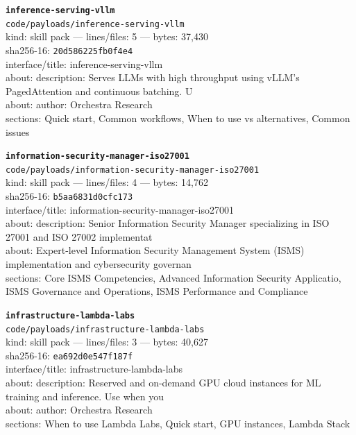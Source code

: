 \noindent\textbf{\texttt{inference-serving-vllm}}\\
\texttt{code/payloads/inference-serving-vllm}\\
kind: skill pack --- lines/files: 5 --- bytes: 37,430\\
sha256-16: \texttt{20d586225fb0f4e4}\\
interface/title: inference-serving-vllm\\
about: description: Serves LLMs with high throughput using vLLM's PagedAttention and continuous batching. U\\
about: author: Orchestra Research\\
sections: Quick start, Common workflows, When to use vs alternatives, Common issues\\
\vspace*{6.0pt}

\noindent\textbf{\texttt{information-security-manager-iso27001}}\\
\texttt{code/payloads/information-security-manager-iso27001}\\
kind: skill pack --- lines/files: 4 --- bytes: 14,762\\
sha256-16: \texttt{b5aa6831d0cfc173}\\
interface/title: information-security-manager-iso27001\\
about: description: Senior Information Security Manager specializing in ISO 27001 and ISO 27002 implementat\\
about: Expert-level Information Security Management System (ISMS) implementation and cybersecurity governan\\
sections: Core ISMS Competencies, Advanced Information Security Applicatio, ISMS Governance and Operations, ISMS Performance and Compliance\\
\vspace*{6.0pt}

\noindent\textbf{\texttt{infrastructure-lambda-labs}}\\
\texttt{code/payloads/infrastructure-lambda-labs}\\
kind: skill pack --- lines/files: 3 --- bytes: 40,627\\
sha256-16: \texttt{ea692d0e547f187f}\\
interface/title: infrastructure-lambda-labs\\
about: description: Reserved and on-demand GPU cloud instances for ML training and inference. Use when you \\
about: author: Orchestra Research\\
sections: When to use Lambda Labs, Quick start, GPU instances, Lambda Stack\\
\vspace*{6.0pt}

